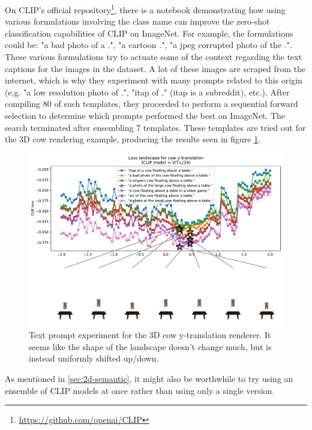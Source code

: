On CLIP's official repository\footnote{\url{https://github.com/openai/CLIP}}, there is a notebook demonstrating how using various formulations involving the class name can improve the zero-shot classification capabilities of CLIP on ImageNet. For example, the formulations could be: "a bad photo of a {}.", "a cartoon {}.", "a jpeg corrupted photo of the {}.". These various formulations try to actuate some of the context regarding the text captions for the images in the dataset. A lot of these images are scraped from the internet, which is why they experiment with many prompts related to this origin (e.g. "a low resolution photo of {}.", "itap of {}." (itap is a subreddit), etc.). After compiling 80 of such templates, they proceeded to perform a sequential forward selection to determine which prompts performed the best on ImageNet. The search terminated after ensembling 7 templates. These templates are tried out for the 3D cow rendering example, producing the results seen in figure \ref{fig:4_cow-text-prompt-engineering}.
\begin{figure}[H]
    \centering
    \includegraphics[width=1.0\textwidth]{figures/4_cow-text-prompt-engineering.pdf}
    \caption{Text prompt experiment for the 3D cow y-translation renderer. It seems like the shape of the landscape doesn't change much, but is instead uniformly shifted up/down.}
    \label{fig:4_cow-text-prompt-engineering}
\end{figure}

As mentioned in \ref{sec:2d-semantic}, it might also be worthwhile to try using an ensemble of CLIP models at once rather than using only a single version.

